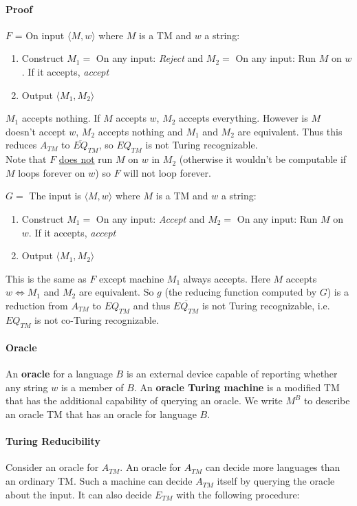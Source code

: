 \documentclass[12 pt]{article}
\begin{document}
\paragraph{Proof}
$F$ = On input $\langle M,w \rangle$ where $M$ is a TM and $w$ a
string:
\begin{enumerate}
\item Construct $M_1 = $ On any input: \textit{Reject} and $M_2 =$ On
  any input: Run $M$ on $w$. If it accepts, \textit{accept}
\item Output $\langle M_1,M_2 \rangle$
\end{enumerate}
$M_1$ accepts nothing. If $M$ accepts $w$, $M_2$ accepts
everything. However is $M$ doesn't accept $w$, $M_2$ accepts nothing
and $M_1$ and $M_2$ are equivalent. Thus this reduces $A_{TM}$ to
$\overline{EQ}_{TM}$, so $EQ_{TM}$ is not Turing recognizable.
\\ Note that $F$ \underline{does not} run $M$ on $w$ in $M_2$
(otherwise it wouldn't be computable if $M$ loops forever on $w$) so
$F$ will not loop forever.

$G =$ The input is $\langle M,w \rangle$ where $M$ is a TM and $w$ a string:
\begin{enumerate}
\item Construct $M_1 = $ On any input: \textit{Accept} and $M_2 =$ On
  any input: Run $M$ on $w$. If it accepts, \textit{accept}
\item Output $\langle M_1,M_2 \rangle$
\end{enumerate}
This is the same as $F$ except machine $M_1$ always accepts. Here $M$
accepts $w \iff M_1$ and $M_2$ are equivalent. So $g$ (the reducing
function computed by $G$) is a reduction from $A_{TM}$ to $EQ_{TM}$
and thus $\overline{EQ_{TM}}$ is not Turing recognizable, i.e.\
$EQ_{TM}$ is not co-Turing recognizable.
\paragraph{Oracle} An \textbf{oracle} for a language $B$ is an
external device capable of reporting whether any string $w$ is a
member of $B$. An \textbf{oracle Turing machine} is a modified TM that
has the additional capability of querying an oracle. We write $M^B$ to
describe an oracle TM that has an oracle for language $B$.
\paragraph{Turing Reducibility}
Consider an oracle for $A_{TM}$. An oracle for $A_{TM}$ can decide
more languages than an ordinary TM. Such a machine can decide $A_{TM}$
itself by querying the oracle about the input. It can also decide
$E_{TM}$ with the following procedure:
\end{document}
